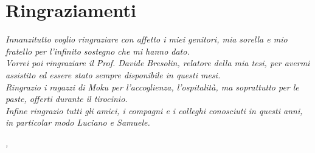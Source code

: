
\cleardoublepage
{}
{}

\bigskip

\begingroup
\let\clearpage\relax
\let\cleardoublepage\relax
\let\cleardoublepage\relax

\chapter*{Ringraziamenti}

\noindent \textit{Innanzitutto voglio ringraziare con affetto i miei genitori, mia sorella e mio fratello per l'infinito sostegno che mi hanno dato.}\\

\noindent \textit{Vorrei poi ringraziare il Prof. Davide Bresolin, relatore della mia tesi, per avermi assistito ed essere stato sempre disponibile in questi mesi.}\\

\noindent \textit{Ringrazio i ragazzi di \textit{Moku} per l'accoglienza, l'ospitalità, ma soprattutto per le paste, offerti durante il tirocinio.}\\

\noindent \textit{Infine ringrazio tutti gli amici, i compagni e i colleghi conosciuti in questi anni, in particolar modo Luciano e Samuele.}\\

\bigskip

\noindent\textit{\myLocation, \myTime}
\hfill \myName

\endgroup

